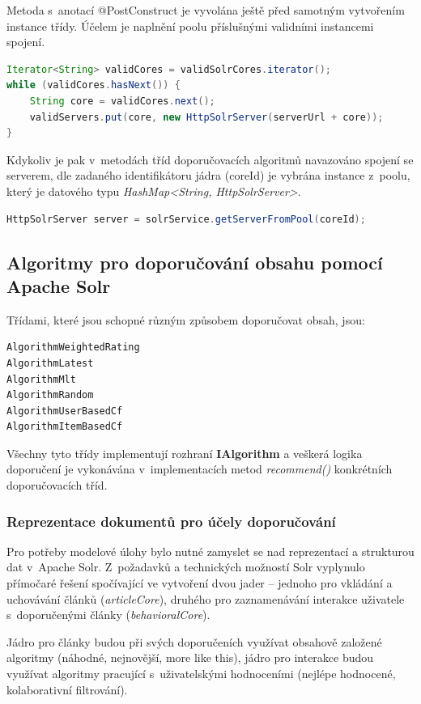 \documentclass[thesis=M,czech]{FITthesis}[2014/05/07]
\begin{document}
Metoda s~anotací @PostConstruct je vyvolána ještě před samotným vytvořením instance třídy. Účelem je naplnění poolu příslušnými validními instancemi spojení.

\begin{lstlisting}[language=java]
Iterator<String> validCores = validSolrCores.iterator();
while (validCores.hasNext()) {
    String core = validCores.next();
    validServers.put(core, new HttpSolrServer(serverUrl + core));
}
\end{lstlisting}

Kdykoliv je pak v~metodách tříd doporučovacích algoritmů navazováno spojení se serverem, dle zadaného identifikátoru jádra (coreId) je vybrána instance z~poolu, který je datového typu \emph{HashMap<String, HttpSolrServer>}. 

\begin{lstlisting}[language=java]
HttpSolrServer server = solrService.getServerFromPool(coreId);
\end{lstlisting}

\subsection{Algoritmy pro doporučování obsahu pomocí Apache Solr}
\label{sec:alg}
Třídami, které jsou schopné různým způsobem doporučovat obsah, jsou:

\begin{verbatim}
AlgorithmWeightedRating
AlgorithmLatest
AlgorithmMlt
AlgorithmRandom
AlgorithmUserBasedCf
AlgorithmItemBasedCf				
\end{verbatim}

Všechny tyto třídy implementují rozhraní \textbf{IAlgorithm} a veškerá logika doporučení je vykonávána v~implementacích metod \emph{recommend()} konkrétních doporučovacích tříd.

\subsubsection{Reprezentace dokumentů pro účely doporučování}

Pro potřeby modelové úlohy bylo nutné zamyslet se nad reprezentací a strukturou dat v~Apache Solr. Z~požadavků a technických možností Solr vyplynulo přímočaré řešení spočívající ve vytvoření dvou jader – jednoho pro vkládání a uchovávání článků (\emph{articleCore}), druhého pro zaznamenávání interakce uživatele s~doporučenými články (\emph{behavioralCore}). 

Jádro pro články budou při svých doporučeních využívat obsahově založené algoritmy (náhodné, nejnovější, more like this), jádro pro interakce budou využívat algoritmy pracující s~uživatelskými hodnoceními (nejlépe hodnocené, kolaborativní filtrování).
\end{document}
